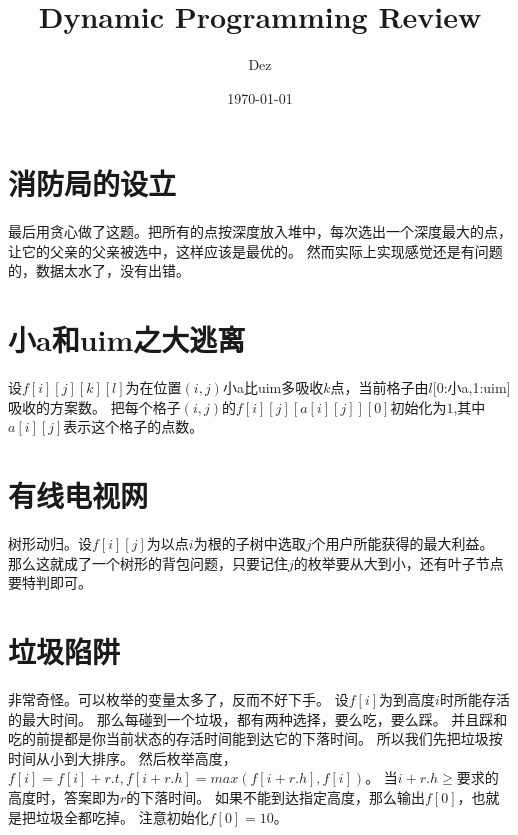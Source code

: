 \documentclass{article}
\title{Dynamic Programming Review}
\author{Dez}
\date{\today}
\begin{document}
\maketitle

\section{消防局的设立}
最后用贪心做了这题。把所有的点按深度放入堆中，每次选出一个深度最大的点，让它的父亲的父亲被选中，这样应该是最优的。
然而实际上实现感觉还是有问题的，数据太水了，没有出错。

\section{小a和uim之大逃离}
设$f[i][j][k][l]$为在位置$(i,j)$小a比uim多吸收$k$点，当前格子由$l$[0:小a,1:uim]吸收的方案数。
把每个格子$(i,j)$的$f[i][j][a[i][j]][0]$初始化为$1$,其中$a[i][j]$表示这个格子的点数。

\section{有线电视网}
树形动归。设$f[i][j]$为以点$i$为根的子树中选取$j$个用户所能获得的最大利益。
那么这就成了一个树形的背包问题，只要记住$j$的枚举要从大到小，还有叶子节点要特判即可。

\section{垃圾陷阱}
非常奇怪。可以枚举的变量太多了，反而不好下手。
设$f[i]$为到高度$i$时所能存活的最大时间。
那么每碰到一个垃圾，都有两种选择，要么吃，要么踩。
并且踩和吃的前提都是你当前状态的存活时间能到达它的下落时间。
所以我们先把垃圾按时间从小到大排序。
然后枚举高度，$f[i]=f[i]+r.t,f[i+r.h]=max(f[i+r.h],f[i])$。
当$i+r.h\geq$要求的高度时，答案即为$r$的下落时间。
如果不能到达指定高度，那么输出$f[0]$，也就是把垃圾全都吃掉。
注意初始化$f[0]=10$。
\end{document}
